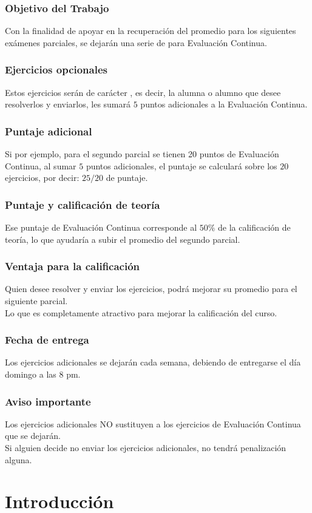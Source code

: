 \documentclass[14pt]{beamer}
\begin{document}
\begin{frame}
\frametitle{Objetivo del Trabajo}
Con la finalidad de apoyar en la recuperación del promedio para los siguientes exámenes parciales, \pause se dejarán una serie de  para Evaluación Continua.
\end{frame}
\begin{frame}
\frametitle{Ejercicios opcionales}
Estos ejercicios serán de carácter , \pause es decir, la alumna o alumno que desee resolverlos y enviarlos, les sumará $5$ puntos adicionales a la Evaluación Continua.
\end{frame}
\begin{frame}
\frametitle{Puntaje adicional}
Si por ejemplo, para el segundo parcial se tienen 20 puntos de Evaluación Continua, \pause al sumar $5$ puntos adicionales, el puntaje se calculará sobre los $20$ ejercicios, \pause por decir: \pause $25/20$ de puntaje.
\end{frame}
\begin{frame}
\frametitle{Puntaje y calificación de teoría}
Ese puntaje de Evaluación Continua corresponde al $50\%$ de la calificación de teoría, \pause lo que ayudaría a subir el promedio del segundo parcial.
\end{frame}
\begin{frame}
\frametitle{Ventaja para la calificación}
Quien desee resolver y enviar los ejercicios, podrá mejorar su promedio para el siguiente parcial.
\\
\bigskip
Lo que es completamente atractivo para mejorar la calificación del curso.
\end{frame}
\begin{frame}
\frametitle{Fecha de entrega}
Los ejercicios adicionales se dejarán cada semana, \pause debiendo de entregarse el día domingo a las 8 pm.
\end{frame}
\begin{frame}
\frametitle{Aviso importante}
Los ejercicios adicionales NO sustituyen a los ejercicios de Evaluación Continua que se dejarán.
\\
\bigskip
\pause
Si alguien decide no enviar los ejercicios adicionales, no tendrá penalización alguna.
\end{frame}

\section{Introducción}
\end{document}
